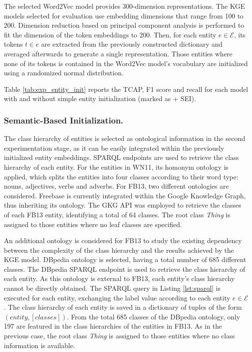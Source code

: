 The selected Word2Vec model provides 300-dimension representations. The KGE models selected for evaluation use embedding dimensions that range from 100 to 200. Dimension reduction based on principal component analysis is performed to fit the dimension of the token embeddings to 200. Then, for each entity $e \in \mathcal{E}$, its tokens $t \in e$ are extracted from the previously constructed dictionary and averaged afterwards to generate a single representation. Those entities where none of its tokens is contained in the Word2Vec model's vocabulary are initialized using a randomized normal distribution.

Table \ref{tab:exp_entity_init} reports the TCAP, F1 score and recall for each model with and without simple entity initialization (marked as + SEI).

\subsubsection{Semantic-Based Initialization.}
The class hierarchy of entities is selected as ontological information in the second experimentation stage, as it can be easily integrated within the previously initialized entity embeddings. SPARQL endpoints are used to retrieve the class hierarchy of each entity. For the entities in WN11, its homonym ontology is applied, which splits the entities into four classes according to their word type: nouns, adjectives, verbs and adverbs. For FB13, two different ontologies are considered. Freebase is currently integrated within the Google Knowledge Graph, thus inheriting its ontology. The GKG API was employed to retrieve the classes of each FB13 entity, identifying a total of 64 classes. The root class \textit{Thing} is assigned to those entities where no leaf classes are specified.

An additional ontology is considered for FB13 to study the existing dependency between the complexity of the class hierarchy and the results achieved by the KGE model. DBpedia ontology is selected, having a total number of 685 different classes. The DBpedia SPARQL endpoint is used to retrieve the class hierarchy of each entity. As this ontology is external to FB13, each entity's class hierarchy cannot be directly obtained. The SPARQL query in Listing \ref{lst:sparql} is executed for each entity, exchanging the label value according to each entity $e \in \mathcal{E}$. The class hierarchy of each entity is saved in a dictionary of tuples of the form $(entity, [classes])$. From the total 685 classes of the DBpedia ontology, only 197 are featured in the class hierarchies of the entities in FB13. As in the previous case, the root class \textit{Thing} is assigned to those entities where no class information is available.

